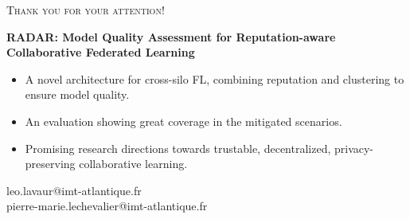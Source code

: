 \begin{frame}
  \centering\scshape\large Thank you for your attention!

  \vfill
  
  \normalshape\normalsize

  \textbf{RADAR: Model Quality Assessment for Reputation-aware\\ Collaborative Federated Learning}
  \medskip
  
  \raggedright
  \begin{itemize}
    \item A novel architecture for cross-silo FL, combining reputation and clustering to ensure model quality.
    \item An evaluation showing great coverage in the mitigated scenarios.
    \item Promising research directions towards trustable, decentralized, privacy-preserving collaborative learning.
  \end{itemize}

  \vfill

  \centering\small
  leo.lavaur@imt-atlantique.fr\\
  pierre-marie.lechevalier@imt-atlantique.fr

\end{frame}


